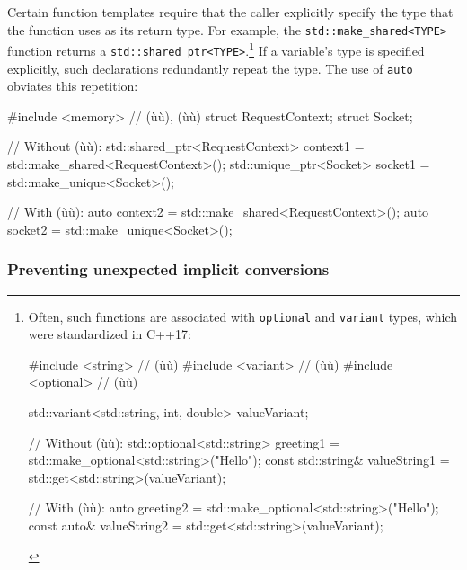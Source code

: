 Certain function templates require that the caller explicitly specify
the type that the function uses as its return type. For example, the
\lstinline!std::make_shared<TYPE>! function returns a
\lstinline!std::shared_ptr<TYPE>!.{\cprotect\footnote{Often, such
functions are associated with \lstinline!optional! and \lstinline!variant!
types, which were standardized in C++17:

\begin{emcppshiddenlisting}[emcppsbatch=e5]
#include <string>    // (ù{}ù)
#include <variant>   // (ù{}ù)
#include <optional>  // (ù{}ù)
\end{emcppshiddenlisting}
\begin{emcppslisting}[emcppsbatch=e5,emcppsstandards={c++17},style=footcode]
std::variant<std::string, int, double> valueVariant;

// Without (ù{}ù):
std::optional<std::string> greeting1 = std::make_optional<std::string>("Hello");
const std::string& valueString1 = std::get<std::string>(valueVariant);

// With (ù{}ù):
auto greeting2 = std::make_optional<std::string>("Hello");
const auto& valueString2 = std::get<std::string>(valueVariant);
\end{emcppslisting}
      }} If a variable's type is specified explicitly, such declarations
redundantly repeat the type. The use of \lstinline!auto! obviates this repetition:

\begin{emcppshiddenlisting}[emcppsbatch=e5]
#include <memory>  // (ù{}ù), (ù{}ù)
struct RequestContext{};
struct Socket{};
\end{emcppshiddenlisting}
\begin{emcppslisting}[emcppsbatch=e5]
// Without (ù{}ù):
std::shared_ptr<RequestContext> context1 = std::make_shared<RequestContext>();
std::unique_ptr<Socket>         socket1  = std::make_unique<Socket>();

// With (ù{}ù):
auto context2 = std::make_shared<RequestContext>();
auto socket2  = std::make_unique<Socket>();
\end{emcppslisting}
    

\subsubsection[Preventing unexpected implicit conversions]{Preventing unexpected implicit conversions}\label{preventing-unexpected-implicit-conversions}


